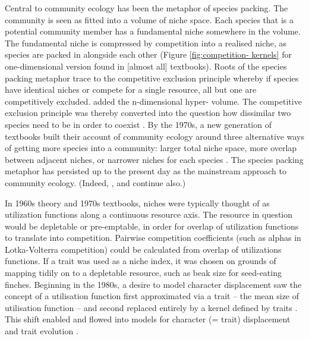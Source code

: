 \documentclass[a4paper,11pt]{article}
\begin{document}
Central to community ecology has been the metaphor of species packing. The
community is seen as fitted into a volume of niche space. Each species that is
a potential community member has a fundamental niche somewhere in the volume.
The fundamental niche is compressed by competition into a realised niche, as
species are packed in alongside each other (Figure \ref{fig:competition-
kernels} for one-dimensional version found in [almost all] textbooks). Roots
of the species packing metaphor trace to the competitive exclusion principle
\citep{Lotka-1925, Volterra-1926, Gause-1934} whereby if species have
identical niches or compete for a single resource, all but one are
competitively excluded. \citet{Hutchinson-1957} added the n-dimensional hyper-
volume. The competitive exclusion principle was thereby converted into the
question how  dissimilar two species need to be in order to coexist
\citep{MacArthur-1967, Slatkin-1980}. By the 1970s, a new generation of
textbooks built their account of community ecology around three alternative
ways of getting more species into a community: larger total niche space, more
overlap between adjacent niches, or narrower niches for each species
\citep{Whittaker-1970,Krebs-1972,Ricklefs-1973,Pianka-1974}. The species
packing  metaphor has persisted up to the present day as the mainstream
approach to  community ecology. (Indeed,  \citet{Krebs-2013},
\citet{Ricklefs-1999} and \citet {Pianka-1999} continue also.)

In 1960s theory and 1970s textbooks, niches were typically thought of as
utilization functions along a continuous resource axis. The resource in
question would be depletable or pre-emptable, in order for overlap of
utilization functions to translate into competition. Pairwise competition
coefficients (such as alphas in Lotka-Volterra competition) could be
calculated from overlap of utilizations functions. If a trait was used as a
niche index, it was chosen on grounds of mapping tidily on to a depletable
resource, such as beak size for seed-eating finches. Beginning in the 1980s,
a desire to model character displacement saw the concept of a utilisation function
first approximated via a trait -- the mean size of utilisation function \citep
{Roughgarden-1979} --  and second replaced entirely by a kernel defined by traits
\citep{Slatkin-1980,Taper-1985}. This shift enabled and flowed into
models for character (= trait) displacement \citep[e.g.,][]{Taper-1985,
Case-2000, Goldberg-2006} and trait evolution
\citep{Brown-1987,Geritz-1998,Geritz-1999,Dieckmann-1999, Abrams-2001}. 
\end{document}

